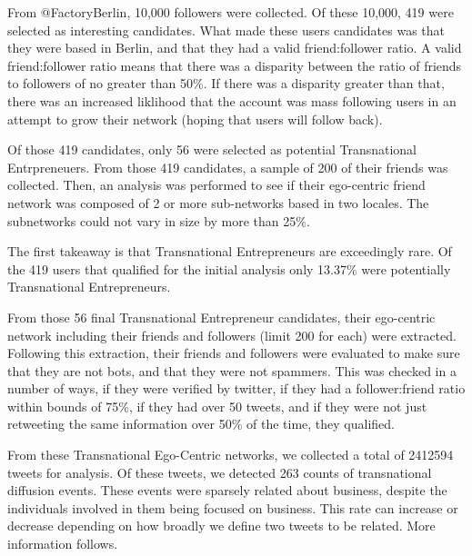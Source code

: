 From @FactoryBerlin, 10,000 followers were collected. Of these 10,000,
419 were selected as interesting candidates. What made these users
candidates was that they were based in Berlin, and that they had
a valid friend:follower ratio. A valid friend:follower ratio means
that there was a disparity between the ratio of friends to followers
of no greater than 50\%. If there was a disparity greater than that,
there was an increased liklihood that the account was mass following
users in an attempt to grow their network (hoping that users will follow
back).

Of those 419 candidates, only 56 were selected as potential Transnational
Entrpreneuers. From those 419 candidates, a sample of 200 of their friends
was collected. Then, an analysis was performed to see if their ego-centric
friend network was composed of 2 or more sub-networks based in two locales.
The subnetworks could not vary in size by more than 25\%.

The first takeaway is that Transnational Entrepreneurs are exceedingly
rare. Of the 419 users that qualified for the initial analysis only
13.37\% were potentially Transnational Entrepreneurs.

From those 56 final Transnational Entrepreneur candidates, their
ego-centric network including their friends and followers (limit 200
for each) were extracted. Following this extraction, their friends and
followers were evaluated to make sure that they are not bots, and that
they were not spammers. This was checked in a number of ways, if they
were verified by twitter, if they had a follower:friend ratio within
bounds of 75\%, if they had over 50 tweets, and if they were not just
retweeting the same information over 50\% of the time, they qualified.

From these Transnational Ego-Centric networks, we collected a total of
2412594 tweets for analysis. Of these tweets, we detected 263 counts
of transnational diffusion events. These events were sparsely related
about business, despite the individuals involved in them being focused
on business. This rate can increase or decrease depending on how
broadly we define two tweets to be related. More information follows.

